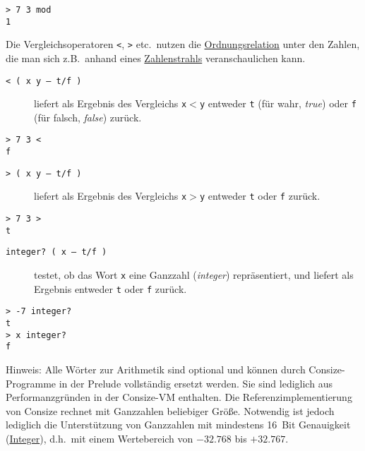 \begin{verbatim}
> 7 3 mod
1
\end{verbatim}

Die Vergleichsoperatoren \verb|<|, \verb|>| etc.\ nutzen die \href{http://de.wikipedia.org/wiki/Ordnungsrelation}{Ordnungsrelation} unter den Zahlen, die man sich z.B.\ anhand eines \href{http://de.wikipedia.org/wiki/Zahlengerade}{Zahlenstrahls} veranschaulichen kann.

\begin{description}
\item[\texttt{< ( x y -- t/f )}] liefert als Ergebnis des Vergleichs \verb|x|$<$\verb|y| entweder \verb|t| (für wahr, \emph{true}) oder \verb|f| (für falsch, \emph{false}) zurück.
\end{description}

\begin{verbatim}
> 7 3 <
f
\end{verbatim}

\begin{description}
\item[\texttt{> ( x y -- t/f )}] liefert als Ergebnis des Vergleichs \verb|x|$>$\verb|y| entweder \verb|t| oder \verb|f| zurück.
\end{description}

\begin{verbatim}
> 7 3 >
t
\end{verbatim}

\begin{description}
\item[\texttt{integer? ( x -- t/f )}] testet, ob das Wort \verb|x| eine Ganzzahl (\emph{integer}) repräsentiert, und liefert als Ergebnis entweder \verb|t| oder \verb|f| zurück.
\end{description}

\begin{verbatim}
> -7 integer?
t
> x integer?
f
\end{verbatim}

Hinweis: Alle Wörter zur Arithmetik sind optional und können durch Consize-Programme in der Prelude vollständig ersetzt werden. Sie sind lediglich aus Performanzgründen in der Consize-VM enthalten. Die Referenzimplementierung von Consize rechnet mit Ganzzahlen beliebiger Größe. Notwendig ist jedoch lediglich die Unterstützung von Ganzzahlen mit mindestens 16~Bit Genauigkeit (\href{http://de.wikipedia.org/wiki/Integer\_(Datentyp)}{Integer}), d.h.\ mit einem Wertebereich von $-32.768$ bis $+32.767$.

